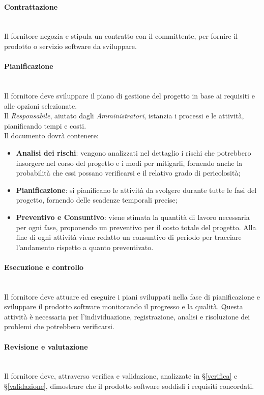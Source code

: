 \paragraph{Contrattazione} \-\\
Il fornitore negozia e stipula un contratto con il committente, per fornire il prodotto o servizio software da sviluppare.
\paragraph{Pianificazione} \-\\
Il fornitore deve sviluppare il piano di gestione del progetto in base ai requisiti e alle opzioni selezionate. \\ 
Il \textit{Responsabile}, aiutato dagli \textit{Amministratori}, istanzia i processi e le attività, pianificando tempi e costi. \\
Il documento dovrà contenere:
\begin{itemize}
	\item \textbf{Analisi dei rischi}: vengono analizzati nel dettaglio i rischi che potrebbero insorgere nel corso del progetto e i modi per mitigarli, fornendo anche la probabilità che essi possano verificarsi e il relativo grado di pericolosità; 
	\item \textbf{Pianificazione}: si pianificano le attività da svolgere durante tutte le fasi del progetto, fornendo delle scadenze temporali precise;
	\item \textbf{Preventivo e Consuntivo}:  viene stimata la quantità
	di lavoro necessaria per ogni fase, proponendo un preventivo per il costo totale
	del progetto. Alla fine di ogni attività viene redatto un consuntivo di periodo
	per tracciare l’andamento rispetto a quanto preventivato.
	
\end{itemize}

\paragraph{Esecuzione e controllo} \-\\
Il fornitore deve attuare ed eseguire i piani sviluppati nella fase di 
pianificazione e sviluppare il prodotto software monitorando il progresso e la 
qualità. Questa attività è necessaria per l'individuazione, registrazione, analisi e risoluzione dei problemi che potrebbero verificarsi.

\paragraph{Revisione e valutazione} \-\\
Il fornitore deve, attraverso verifica e validazione, analizzate in §\ref{verifica} e §\ref{validazione},  dimostrare che 
il prodotto software soddisfi i requisiti concordati.

